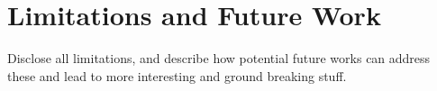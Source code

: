 \section{Limitations and Future Work}
\label{sec:conclusion}

Disclose all limitations, and describe how potential future works can address these and lead to more interesting and ground breaking stuff.
